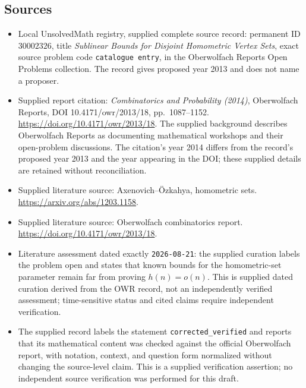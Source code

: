 \documentclass[11pt]{article}
\begin{document}
\subsection{Sources}
\begin{itemize}
\item Local UnsolvedMath registry, supplied complete source record: permanent ID \(30002326\), title \emph{Sublinear Bounds for Disjoint Homometric Vertex Sets}, exact source problem code \texttt{catalogue entry}, in the Oberwolfach Reports Open Problems collection. The record gives proposed year 2013 and does not name a proposer.
\item Supplied report citation: \emph{Combinatorics and Probability (2014)}, Oberwolfach Reports, DOI 10.4171/owr/2013/18, pp.\ 1087--1152. \url{https://doi.org/10.4171/owr/2013/18}. The supplied background describes Oberwolfach Reports as documenting mathematical workshops and their open-problem discussions. The citation's year 2014 differs from the record's proposed year 2013 and the year appearing in the DOI; these supplied details are retained without reconciliation.
\item Supplied literature source: Axenovich--Özkahya, homometric sets. \url{https://arxiv.org/abs/1203.1158}.
\item Supplied literature source: Oberwolfach combinatorics report. \url{https://doi.org/10.4171/owr/2013/18}.
\item Literature assessment dated exactly \texttt{2026-08-21}: the supplied curation labels the problem open and states that known bounds for the homometric-set parameter remain far from proving \(h(n)=o(n)\). This is supplied dated curation derived from the OWR record, not an independently verified assessment; time-sensitive status and cited claims require independent verification.
\item The supplied record labels the statement \texttt{corrected\_verified} and reports that its mathematical content was checked against the official Oberwolfach report, with notation, context, and question form normalized without changing the source-level claim. This is a supplied verification assertion; no independent source verification was performed for this draft.
\end{itemize}
\end{document}
